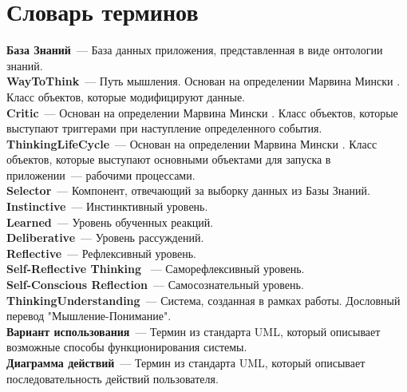 \chapter*{Словарь терминов}             %

\textbf{База Знаний}~--- База данных приложения, представленная в виде онтологии знаний. \\

\textbf{WayToThink}~--- Путь мышления. Основан на определении Марвина Мински \cite{EmotionMachine}. Класс объектов, которые модифицируют данные. \\

\textbf{Critic}~--- Основан на определении Марвина Мински \cite{EmotionMachine}. Класс объектов, которые выступают триггерами при наступление определенного события. \\

\textbf{ThinkingLifeCycle}~--- Основан на определении Марвина Мински \cite{EmotionMachine}. Класс объектов, которые выступают основными объектами для запуска в приложении~--- рабочими процессами. \\

\textbf{Selector}~--- Компонент, отвечающий за выборку данных из Базы Знаний. \\

\textbf{Instinctive}~--- Инстинктивный уровень. \\

\textbf{Learned}~--- Уровень обученных реакций. \\

\textbf{Deliberative}~--- Уровень рассуждений. \\

\textbf{Reflective}~--- Рефлексивный уровень. \\

\textbf{Self-Reflective Thinking	}~--- Саморефлексивный уровень. \\

\textbf{Self-Conscious Reflection}~--- Самосознательный уровень. \\

\textbf{ThinkingUnderstanding}~--- Система, созданная в рамках работы. Дословный перевод "Мышление-Понимание".\\  

\textbf{Вариант использования}~--- Термин из стандарта UML, который описывает возможные способы функционирования системы.\\  

\textbf{Диаграмма действий}~--- Термин из стандарта UML, который описывает последовательность действий пользователя.\\   
 
\clearpage